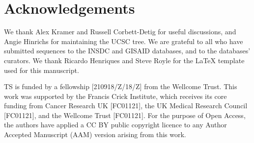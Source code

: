 \section*{Acknowledgements}
We thank Alex Kramer and Russell Corbett-Detig for useful discussions, and Angie Hinrichs for maintaining the UCSC tree.  We are grateful to all who have submitted sequences to the INSDC and GISAID databases, and to the databases' curators. We thank Ricardo Henriques and Steve Royle for the LaTeX template used for this manuscript.

TS is funded by a fellowship [210918/Z/18/Z] from the Wellcome Trust. This work was supported by the Francis Crick Institute, which receives its core funding from Cancer Research UK [FC01121], the UK Medical Research Council [FC01121], and the Wellcome Trust [FC01121]. For the purpose of Open Access,
the authors have applied a CC BY public copyright licence
to any Author Accepted Manuscript (AAM) version arising
from this work.